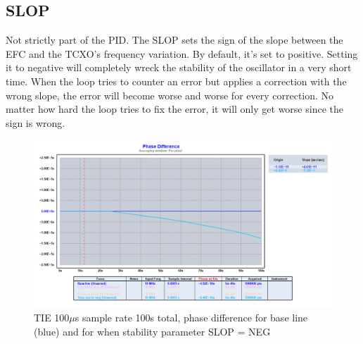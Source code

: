 \documentclass[11pt,english,a4paper]{article}
\begin{document}
\subsection{SLOP}
Not strictly part of the PID. The SLOP sets the sign of the slope between the EFC and the TCXO's frequency variation. By default, it's set to positive. Setting it to negative will completely wreck the stability of the oscillator in a very short time. When the loop tries to counter an error but applies a correction with the wrong slope, the error will become worse and worse for every correction. No matter how hard the loop tries to fix the error, it will only get worse since the sign is wrong. 

\begin{figure}[!htb]
  \centering
    \includegraphics[width=1\textwidth]{SLOP.png}
      \caption{TIE 100$\mu$s sample rate 100s total, phase difference for base line (blue) and for when stability parameter SLOP = NEG}
          \label{fig:SLOP}
\end{figure}
\end{document}
